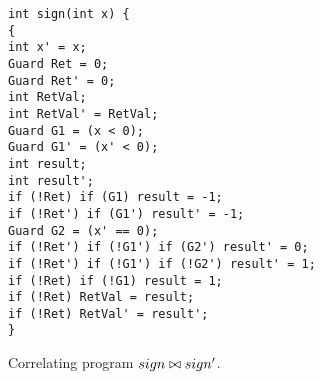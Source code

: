 \begin{figure}
\centering
\begin{lstlisting}
int sign(int x) {
{
int x' = x;
Guard Ret = 0;
Guard Ret' = 0;
int RetVal;
int RetVal' = RetVal;
Guard G1 = (x < 0);
Guard G1' = (x' < 0);
int result;
int result';
if (!Ret) if (G1) result = -1;
if (!Ret') if (G1') result' = -1;
Guard G2 = (x' == 0);
if (!Ret') if (!G1') if (G2') result' = 0;
if (!Ret') if (!G1') if (!G2') result' = 1;
if (!Ret) if (!G1) result = 1;
if (!Ret) RetVal = result;
if (!Ret) RetVal' = result';
}
\end{lstlisting}
\caption{Correlating program $sign \bowtie sign'$.}
\end{figure}

